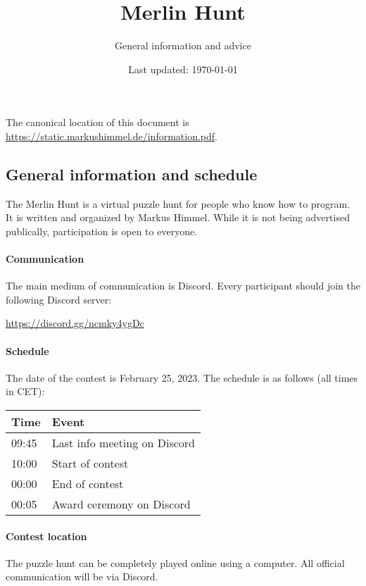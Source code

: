 \documentclass[fontsize=10pt,a4paper,DIV=12,parskip=half]{scrarticle}
\title{Merlin Hunt}
\subtitle{General information and advice}
\date{Last updated: \today}
\begin{document}
\maketitle

The canonical location of this document is \url{https://static.markushimmel.de/information.pdf}.

\subsection*{General information and schedule}

The Merlin Hunt is a virtual puzzle hunt for people who know how to program.
It is written and organized by Markus Himmel. While it is not being advertised
publically, participation is open to everyone.

\paragraph{Communication} The main medium of communication is Discord. Every participant should join the following
Discord server:

\begin{center}
	\url{https://discord.gg/ncmky4ygDc}
\end{center}

\paragraph{Schedule}
The date of the contest is February 25, 2023. The schedule is as follows (all times in CET):

\begin{center}
	\begin{tabular}{@{}ll@{}}
		\toprule
		Time & Event \\ \midrule
		09:45 & Last info meeting on Discord \\
		10:00 & Start of contest \\
		00:00 & End of contest \\
		00:05 & Award ceremony on Discord \\ \bottomrule
	\end{tabular}
\end{center}

\paragraph{Contest location}
The puzzle hunt can be completely played online using a computer. All official
communication will be via Discord.
\end{document}
